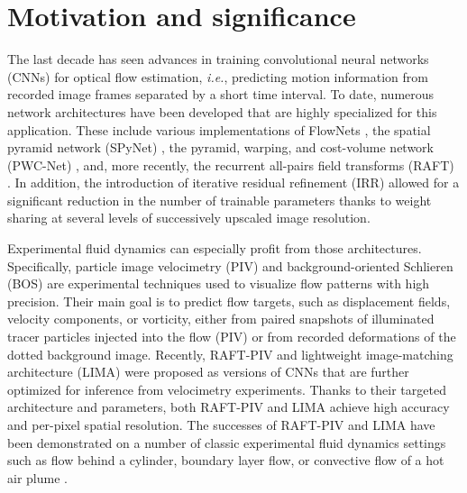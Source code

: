 \documentclass[a4paper,fleqn]{cas-dc}
\begin{document}
\maketitle

\section{Motivation and significance\label{sec:introduction}}

The last decade has seen advances in training convolutional neural networks (CNNs) for optical flow estimation, \textit{i.e.}, predicting motion information from recorded image frames separated by a short time interval. To date, numerous network architectures have been developed that are highly specialized for this application. These include various implementations of FlowNets \citep{dosovitskiy2015flownet, ilg2017flownet, hui2018liteflownet}, the spatial pyramid network (SPyNet) \cite{ranjan2017optical}, the pyramid, warping, and cost-volume network (PWC-Net) \cite{sun2018pwc}, and, more recently, the recurrent all-pairs field transforms (RAFT) \cite{teed2020raft}. In addition, the introduction of iterative residual refinement (IRR) \cite{hur2019iterative} allowed for a significant reduction in the number of trainable parameters thanks to weight sharing at several levels of successively upscaled image resolution.

Experimental fluid dynamics can especially profit from those architectures. Specifically, particle image velocimetry (PIV) and background-oriented Schlieren (BOS) are experimental techniques used to visualize flow patterns with high precision. Their main goal is to predict flow targets, such as displacement fields, velocity components, or vorticity, either from paired snapshots of illuminated tracer particles injected into the flow (PIV) or from recorded deformations of the dotted background image. Recently, RAFT-PIV \cite{lagemann2021deep} and lightweight image-matching architecture (LIMA) \citep{manickathan2023lightweight} were proposed as versions of CNNs that are further optimized for inference from velocimetry experiments. Thanks to their targeted architecture and parameters, both RAFT-PIV and LIMA achieve high accuracy and per-pixel spatial resolution. The successes of RAFT-PIV and LIMA have been demonstrated on a number of classic experimental fluid dynamics settings such as flow behind a cylinder, boundary layer flow, or convective flow of a hot air plume \cite{mucignat2023lightweight}.
\end{document}
